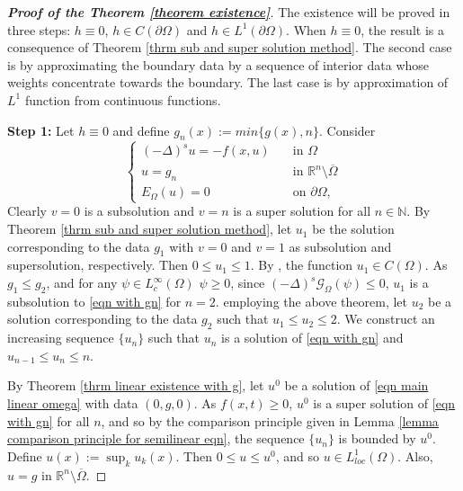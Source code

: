 \documentclass{amsart}
\newcommand{\R}{\mathbb{R}}
\newcommand{\slap}{(-\Delta)^{s}}
\newcommand{\g}[1]{\mathcal{G}_{#1}}
\begin{document}
 \begin{proof}[\textbf{Proof of the Theorem \ref{theorem existence}}]
The existence will be proved in three steps: $h\equiv0$, $h\in C(\partial\Omega)$ and $h\in L^{1}(\partial\Omega)$. When $h\equiv 0$, the result is a consequence of Theorem \ref{thrm sub and super solution method}. The second case is by approximating the boundary data by a sequence of interior data whose weights concentrate towards the boundary. The last case is by approximation of $L^{1}$ function from continuous functions.

    \textbf{Step 1:} Let $h\equiv 0$ and define $g_{n}(x):=min\{g(x),n\}$. Consider 
    \begin{equation}\label{eqn with gn}
        \begin{cases}
         \slap u=-f(x,u)\quad &\text{in } \Omega\\
         u=g_{n} &\text{in }\R^{n}\setminus\overline{\Omega}\\
         E_{\Omega}(u)=0 &\text{on }\partial\Omega,
    \end{cases}
    \end{equation}
    Clearly $v=0$ is a subsolution and $v=n$ is a super solution for all $n\in \mathbb{N}$. By Theorem \ref{thrm sub and super solution method}, let $u_{1}$ be the solution corresponding to the data $g_{1}$ with $v=0$ and $v=1$ as subsolution and supersolution, respectively.  Then $0\leq u_{1}\leq 1$. By \cite{RosSerra2016}, the function $u_{1}\in C(\Omega)$. As $g_{1}\leq g_{2}$, and for any $\psi\in L_{c}^{\infty}(\Omega)$ $\psi\geq 0$, since $\slap \g{\Omega}(\psi)\leq 0$, $u_{1}$ is a subsolution to \eqref{eqn with gn} for $n=2$. employing the above theorem, let $u_{2}$ be a solution corresponding to the data $g_{2}$ such that $u_{1}\leq u_{2}\leq 2$. We construct an increasing sequence $\{u_{n}\}$ such that $u_{n}$ is a solution of \eqref{eqn with gn} and $u_{n-1}\leq u_{n}\leq n$. 
    
    By Theorem \ref{thrm linear existence with g}, let $u^{0}$ be a solution of \eqref{eqn main linear omega} with data $(0,g,0)$. As $f(x,t)\geq 0$, $u^{0}$ is a super solution of \eqref{eqn with gn} for all $n$, and so by the comparison principle given in Lemma \ref{lemma comparison principle for semilinear eqn}, the sequence $\{u_{n}\}$ is bounded by $u^{0}$. Define $u(x):=\sup_{k}u_{k}(x)$. Then $0\leq u\leq u^{0}$, and so $u\in L_{loc}^{1}(\Omega)$. Also, $u=g$ in $\R^{n}\setminus\overline{\Omega}$. 
    

\end{proof}
\end{document}
